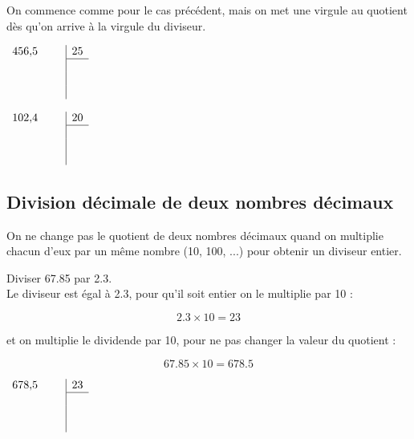 	\begin{mymeth}
		On commence comme pour le cas précédent, mais on met une virgule au quotient dès qu'on arrive à la virgule du diviseur.
	\end{mymeth}

	\begin{myexs}
		\begin{multicols}{2}
			\begin{center}
				$\begin{array}{rc|c}
				\num{456.5} \quad & & 25 \\
				\cline{3-3}
				&  \\
				& & \\
				& & \\
				\end{array}$
			\end{center}
			
			
			\begin{center}
				$\begin{array}{rc|c}
				\num{102.4} \quad & & 20 \\
				\cline{3-3}
				&  \\
				& & \\
				& & \\
				\end{array}$
				
			\end{center}
			
		\end{multicols}
	\end{myexs}
\subsection{Division décimale de deux nombres décimaux}

\begin{myprop}
	On ne change pas le quotient de deux nombres décimaux quand on multiplie chacun d'eux par un même nombre (10, 100, ...) pour obtenir un diviseur entier.
\end{myprop}

\begin{myex}
	Diviser \num{67.85} par \num{2.3}. \\
	
	Le diviseur est égal à \num{2.3}, pour qu'il soit entier on le multiplie par 10 : 
	
		\begin{equation*}
			\num{2.3} \times 10 = 23
		\end{equation*}
		
	et on multiplie le dividende par 10, pour ne pas changer la valeur du quotient :
	
		\begin{equation*}
			\num{67.85} \times 10 = \num{678.5}
		\end{equation*}
		
		
		$\begin{array}{rc|c}
		\num{678.5} \quad & & 23 \\
		\cline{3-3}
		&  \\
		& & \\
		& & \\
		\end{array}$
\end{myex}